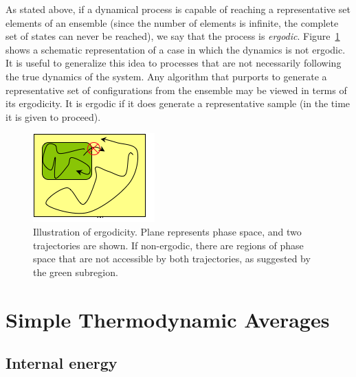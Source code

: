 \documentclass[9pt,bestpractices]{molsim}
\begin{document}
As stated above, if a dynamical process is capable of reaching a
representative set elements of an ensemble (since the number of elements
is infinite, the complete set of states can never be reached), we say
that the process is \emph{ergodic}. Figure~\ref{fig:ergodicity} shows a schematic
representation of a case in which the dynamics is not ergodic. It is
useful to generalize this idea to processes that are not necessarily
following the true dynamics of the system. Any algorithm that purports
to generate a representative set of configurations from the ensemble may
be viewed in terms of its ergodicity. It is ergodic if it does generate a
representative sample (in the time it is given to proceed).

\begin{figure}
\includegraphics[width=\textwidth]{StatMech_figures/image036}
\caption{\label{fig:ergodicity}Illustration of ergodicity. Plane represents phase space, and two trajectories are shown. If non-ergodic, there are regions of phase space that are not accessible by both trajectories, as suggested by the green subregion.}
\end{figure}


\section{Simple Thermodynamic
Averages}\label{simple-thermodynamic-averages}

\subsection{Internal energy}\label{internal-energy}
\end{document}
